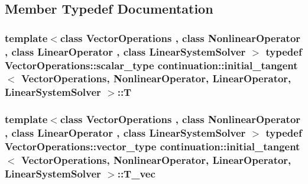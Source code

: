 \subsection{Member Typedef Documentation}
\hypertarget{classcontinuation_1_1initial__tangent_a39f8fc77c4f6d3de481cd8550bb3e768}{
\subsubsection[{T}]{\setlength{\rightskip}{0pt plus 5cm}template$<$class Vector\-Operations , class Nonlinear\-Operator , class Linear\-Operator , class Linear\-System\-Solver $>$ typedef Vector\-Operations\-::scalar\-\_\-type {\bf continuation\-::initial\-\_\-tangent}$<$ Vector\-Operations, Nonlinear\-Operator, Linear\-Operator, Linear\-System\-Solver $>$\-::{\bf T}}}\label{classcontinuation_1_1initial__tangent_a39f8fc77c4f6d3de481cd8550bb3e768}
\hypertarget{classcontinuation_1_1initial__tangent_ad348e9e404ffd58ae936cfae5cddc928}{
\subsubsection[{T\-\_\-vec}]{\setlength{\rightskip}{0pt plus 5cm}template$<$class Vector\-Operations , class Nonlinear\-Operator , class Linear\-Operator , class Linear\-System\-Solver $>$ typedef Vector\-Operations\-::vector\-\_\-type {\bf continuation\-::initial\-\_\-tangent}$<$ Vector\-Operations, Nonlinear\-Operator, Linear\-Operator, Linear\-System\-Solver $>$\-::{\bf T\-\_\-vec}}}\label{classcontinuation_1_1initial__tangent_ad348e9e404ffd58ae936cfae5cddc928}


